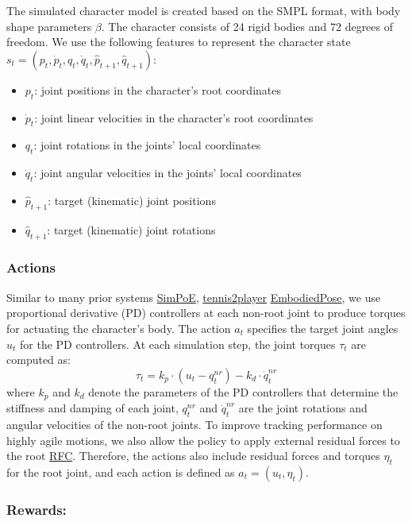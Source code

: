 \documentclass{article}
\begin{document}
The simulated character model is created based on the SMPL format, with body shape parameters $\beta$. The character consists of 24 rigid bodies and 72 degrees of freedom. We use the following features to represent the character state $s_t = (p_t, \dot{p}_t, q_t, \dot{q}_t, \hat{p}_{t+1}, \hat{q}_{t+1})$:

\begin{itemize}
\tightlist
\item
  $p_t$: joint positions in the character's root coordinates
\item
  $\dot{p}_t$: joint linear velocities in the character's root coordinates
\item
  $q_t$: joint rotations in the joints' local coordinates
\item
  $\dot{q}_t$: joint angular velocities in the joints' local coordinates
\item
  $\hat{p}_{t+1}$: target (kinematic) joint positions
\item
  $\hat{q}_{t+1}$: target (kinematic) joint rotations
\end{itemize}

\subsubsection{Actions}\label{actions}

Similar to many prior systems \href{https://arxiv.org/abs/2104.00683}{SimPoE}, \href{https://research.nvidia.com/labs/toronto-ai/vid2player3d/data/tennis_skills_main.pdf}{tennis2player} \href{https://github.com/ZhengyiLuo/EmbodiedPose}{EmbodiedPose}, we use proportional derivative (PD) controllers at each non-root joint to produce torques for actuating the character's body. The action $a_t$ specifies the target joint angles $u_t$ for the PD controllers. At each simulation step, the joint torques $\tau_t$ are computed as: \[\tau_t = k_p \cdot (u_t - q_t^{nr}) - k_d \cdot \dot{q}_t^{nr}\] where $k_p$ and $k_d$ denote the parameters of the PD controllers that determine the stiffness and damping of each joint, $q_t^{nr}$ and $\dot{q}_t^{nr}$ are the joint rotations and angular velocities of the non-root joints. To improve tracking performance on highly agile motions, we also allow the policy to apply external residual forces to the root \href{https://github.com/Khrylx/RFC}{RFC}. Therefore, the actions also include residual forces and torques $\eta_t$ for the root joint, and each action is defined as $a_t = (u_t, \eta_t)$.

\subsubsection{Rewards:}\label{rewards}
\end{document}
